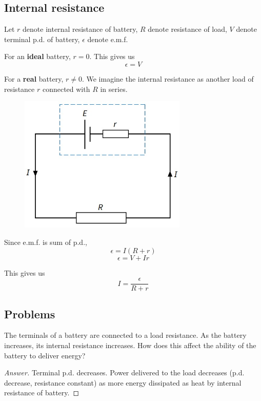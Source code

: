\subsection{Internal resistance}
Let $r$ denote internal resistance of battery, $R$ denote resistance of load, $V$ denote terminal p.d. of battery, $\epsilon$ denote e.m.f.

For an \textbf{ideal} battery, $r=0$. This gives us 
\[ \epsilon=V \]

For a \textbf{real} battery, $r\neq 0$. We imagine the internal resistance as another load of resistance $r$ connected with $R$ in series. 

\begin{figure}[H]
    \centering
    \includegraphics[width=8cm]{images/internal_resistance.jpg}
\end{figure}

Since e.m.f. is sum of p.d., 
\[ \epsilon=I(R+r) \]
\begin{equation}
\epsilon=V+Ir
\end{equation}

This gives us
\[ \boxed{I=\frac{\epsilon}{R+r}} \]

\pagebreak

\subsection*{Problems}
\begin{prbm}
The terminals of a battery are connected to a load resistance. As the battery increases, its internal resistance increases. How does this affect the ability of the battery to deliver energy?
\end{prbm}

\begin{proof}[Answer]
Terminal p.d. decreases. Power delivered to the load decreases (p.d. decrease, resistance constant) as more energy dissipated as heat by internal resistance of battery.
\end{proof}

